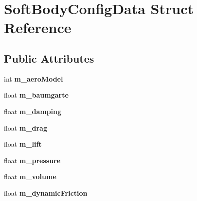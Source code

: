 \hypertarget{struct_soft_body_config_data}{\section{Soft\+Body\+Config\+Data Struct Reference}
\label{struct_soft_body_config_data}
}
\subsection*{Public Attributes}
\begin{DoxyCompactItemize}
\item 
\hypertarget{struct_soft_body_config_data_af2658e3b77549dcfd3d85ce1dc2d92ae}{int {\bfseries m\+\_\+aero\+Model}}\label{struct_soft_body_config_data_af2658e3b77549dcfd3d85ce1dc2d92ae}

\item 
\hypertarget{struct_soft_body_config_data_a498bc0c3b1ced84d6ad8f21f24a5e18e}{float {\bfseries m\+\_\+baumgarte}}\label{struct_soft_body_config_data_a498bc0c3b1ced84d6ad8f21f24a5e18e}

\item 
\hypertarget{struct_soft_body_config_data_ad45a4d2f1fb499325343d4954fee0537}{float {\bfseries m\+\_\+damping}}\label{struct_soft_body_config_data_ad45a4d2f1fb499325343d4954fee0537}

\item 
\hypertarget{struct_soft_body_config_data_adc2ac27dbb0db792daa3f6d120bbd118}{float {\bfseries m\+\_\+drag}}\label{struct_soft_body_config_data_adc2ac27dbb0db792daa3f6d120bbd118}

\item 
\hypertarget{struct_soft_body_config_data_a981dc64e5571bb7b3b3a5443eddcd492}{float {\bfseries m\+\_\+lift}}\label{struct_soft_body_config_data_a981dc64e5571bb7b3b3a5443eddcd492}

\item 
\hypertarget{struct_soft_body_config_data_a4e9e6bb725f91559338f49cbaecbd350}{float {\bfseries m\+\_\+pressure}}\label{struct_soft_body_config_data_a4e9e6bb725f91559338f49cbaecbd350}

\item 
\hypertarget{struct_soft_body_config_data_a5a0c0833698912cf0788cc8d79afec2d}{float {\bfseries m\+\_\+volume}}\label{struct_soft_body_config_data_a5a0c0833698912cf0788cc8d79afec2d}

\item 
\hypertarget{struct_soft_body_config_data_ac042580ed222c57d634b571d3429ef98}{float {\bfseries m\+\_\+dynamic\+Friction}}\label{struct_soft_body_config_data_ac042580ed222c57d634b571d3429ef98}


\end{DoxyCompactItemize}
